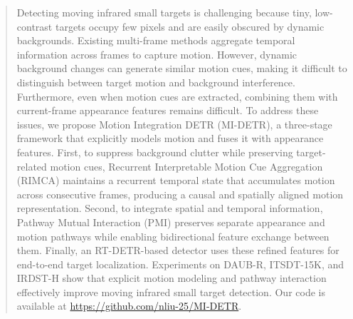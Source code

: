 \begin{abstract}
Detecting moving infrared small targets is challenging because tiny, low-contrast targets occupy few pixels and are easily obscured by dynamic backgrounds. Existing multi-frame methods aggregate temporal information across frames to capture motion. However, dynamic background changes can generate similar motion cues, making it difficult to distinguish between target motion and background interference. Furthermore, even when motion cues are extracted, combining them with current-frame appearance features remains difficult. To address these issues, we propose Motion Integration DETR (MI-DETR), a three-stage framework that explicitly models motion and fuses it with appearance features. First, to suppress background clutter while preserving target-related motion cues, Recurrent Interpretable Motion Cue Aggregation (RIMCA) maintains a recurrent temporal state that accumulates motion across consecutive frames, producing a causal and spatially aligned motion representation. Second, to integrate spatial and temporal information, Pathway Mutual Interaction (PMI) preserves separate appearance and motion pathways while enabling bidirectional feature exchange between them. Finally, an RT-DETR-based detector uses these refined features for end-to-end target localization. Experiments on DAUB-R, ITSDT-15K, and IRDST-H show that explicit motion modeling and pathway interaction effectively improve moving infrared small target detection.
Our code is available at \url{https://github.com/nliu-25/MI-DETR}.
\end{abstract}
